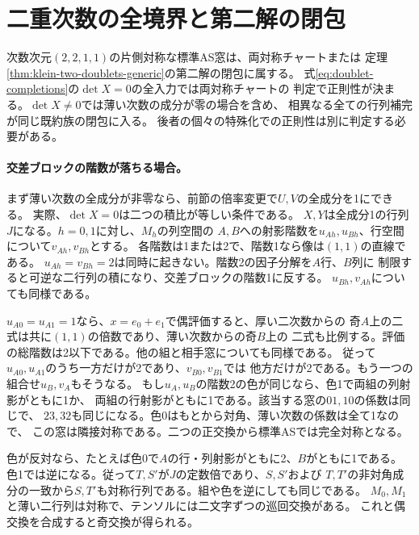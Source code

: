 \section{二重次数の全境界と第二解の閉包}
\label{sec:klein-doublet-boundary}
\begin{theorem}\label{thm:klein-doublet-complete-cover}
次数次元$(2,2,1,1)$の片側対称な標準AS窓は、両対称チャートまたは
定理\ref{thm:klein-two-doublets-generic}の第二解の閉包に属する。
式\eqref{eq:doublet-completions}の$\det X=0$の全入力では両対称チャートの
判定で正則性が決まる。$\det X\ne0$では薄い次数の成分が零の場合を含め、
相異なる全ての行列補完が同じ既約族の閉包に入る。
後者の個々の特殊化での正則性は別に判定する必要がある。
\end{theorem}

\paragraph{交差ブロックの階数が落ちる場合。}
まず薄い次数の全成分が非零なら、前節の倍率変更で$U,V$の全成分を1にできる。
実際、$\det X=0$は二つの積比が等しい条件である。
$X,Y$は全成分1の行列$J$になる。$h=0,1$に対し、$M_h$の列空間の
$A,B$への射影階数を$u_{Ah},u_{Bh}$、行空間について$v_{Ah},v_{Bh}$とする。
各階数は1または2で、階数1なら像は$(1,1)$の直線である。
$u_{Ah}=v_{Bh}=2$は同時に起きない。階数2の因子分解を$A$行、$B$列に
制限すると可逆な二行列の積になり、交差ブロックの階数1に反する。
$u_{Bh},v_{Ah}$についても同様である。

$u_{A0}=u_{A1}=1$なら、$x=e_0+e_1$で偶評価すると、厚い二次数からの
奇$A$上の二式は共に$(1,1)$の倍数であり、薄い次数からの奇$B$上の
二式も比例する。評価の総階数は2以下である。他の組と相手窓についても同様である。
従って$u_{A0},u_{A1}$のうち一方だけが2であり、$v_{B0},v_{B1}$では
他方だけが2である。もう一つの組合せ$u_B,v_A$もそうなる。
もし$u_A,u_B$の階数2の色が同じなら、色1で両組の列射影がともに1か、
両組の行射影がともに1である。該当する窓の$01,10$の係数は同じで、
$23,32$も同じになる。色0はもとから対角、薄い次数の係数は全て1なので、
この窓は隣接対称である。二つの正交換から標準ASでは完全対称となる。

色が反対なら、たとえば色0で$A$の行・列射影がともに2、$B$がともに1である。
色1では逆になる。従って$T,S'$が$J$の定数倍であり、$S,S'$および
$T,T'$の非対角成分の一致から$S,T'$も対称行列である。組や色を逆にしても同じである。
$M_0,M_1$と薄い二行列は対称で、テンソルには二文字ずつの巡回交換がある。
これと偶交換を合成すると奇交換が得られる。

